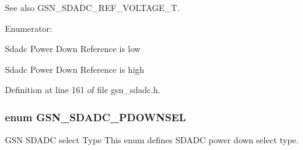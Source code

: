 \begin{DoxySeeAlso}{See also}
GSN\_\-SDADC\_\-REF\_\-VOLTAGE\_\-T. 
\end{DoxySeeAlso}
\begin{Desc}
\item[Enumerator: ]\par
\begin{description}
\item[{\em 
\hypertarget{a00652_gga3fd8f1ef5efcdbab4b29cdd40ca09a32ac41b8abac136266c277dde5c48fc3da6}{
GSN\_\-SDADC\_\-PDREF\_\-ACTIVE}
\label{a00652_gga3fd8f1ef5efcdbab4b29cdd40ca09a32ac41b8abac136266c277dde5c48fc3da6}
}]Sdadc Power Down Reference is low \item[{\em 
\hypertarget{a00652_gga3fd8f1ef5efcdbab4b29cdd40ca09a32ade7574a2321f3308e4ef1e1d0292b0d2}{
GSN\_\-SDADC\_\-PDREF\_\-PDOWN}
\label{a00652_gga3fd8f1ef5efcdbab4b29cdd40ca09a32ade7574a2321f3308e4ef1e1d0292b0d2}
}]Sdadc Power Down Reference is high \end{description}
\end{Desc}



Definition at line 161 of file gsn\_\-sdadc.h.

\hypertarget{a00652_ga8981092cc91f6707abd5185868f1250c}{
\subsubsection[{GSN\_\-SDADC\_\-PDOWNSEL}]{\setlength{\rightskip}{0pt plus 5cm}enum {\bf GSN\_\-SDADC\_\-PDOWNSEL}}}
\label{a00652_ga8981092cc91f6707abd5185868f1250c}


GSN SDADC select Type This enum defines SDADC power down select type. 


